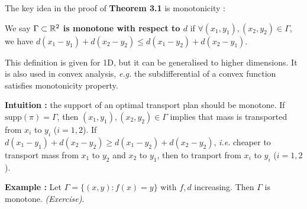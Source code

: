 \documentclass[12pt,a4paper]{article}
\begin{document}
\s

The key idea in the proof of \textbf{Theorem 3.1} is monotonicity :
\s

 We say \textbf{$\Gamma \subset \mathbb{R}^2$ is monotone with respect to $d$} if $\forall (x_1, y_1), (x_2, y_2) \in \Gamma$, we have $d(x_1 -y_1) + d(x_2 -y_2) \leq d(x_1-y_2) +d(x_2-y_1)$.

\quad This definition is given for 1D, but it can be generalised to higher dimensions. It is also used in convex analysis, \textit{e.g.} the subdifferential of a convex function satisfies monotonicity property.
\s

\textbf{Intuition :} the support of an optimal transport plan should be monotone. If $\text{supp}(\pi)= \Gamma$, then $(x_1,y_1) , (x_2, y_2) \in \Gamma$ implies that mass is transported from $x_i$ to $y_i$ ($i=1,2$). If $d(x_1-y_1) +d(x_2-y_2) \geq d(x_1-y_2) + d(x_2-y_2)$, \textit{i.e.} cheaper to transport mass from $x_1$ to $y_2$ and $x_2$ to $y_1$, then to tranport from $x_i$ to $y_i$ ($i=1,2$).
\s

\textbf{Example :} Let $\Gamma = \{(x,y) : f(x)=y\}$ with $f,d$ increasing. Then $\Gamma$ is monotone. \emph{(Exercise)}.
\s
\end{document}
